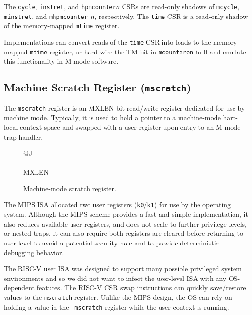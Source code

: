 The {\tt cycle}, {\tt instret}, and {\tt hpmcounter{\em n}} CSRs are
read-only shadows of {\tt mcycle}, {\tt minstret}, and {\tt mhpmcounter{\em
n}}, respectively.  The {\tt time} CSR is a read-only shadow of the
memory-mapped {\tt mtime} register.
\begin{commentary}
Implementations can convert reads of the {\tt time} CSR into loads to
the memory-mapped {\tt mtime} register, or hard-wire the TM bit in
{\tt mcounteren} to 0
and emulate this functionality in M-mode software.
\end{commentary}

\subsection{Machine Scratch Register ({\tt mscratch})}

The {\tt mscratch} register is an MXLEN-bit read/write register
dedicated for use by machine mode.  Typically, it is used to hold a
pointer to a machine-mode hart-local context space and swapped with a
user register upon entry to an M-mode trap handler.

\begin{figure}[h!]
{\footnotesize
\begin{center}
\begin{tabular}{@{}J}
 \\
\hline
{} \\
\hline
MXLEN \\
\end{tabular}
\end{center}
}
\vspace{-0.1in}
\caption{Machine-mode scratch register.}
\label{mscratchreg}
\end{figure}

\begin{commentary}
The MIPS ISA allocated two user registers ({\tt k0}/{\tt k1}) for use
by the operating system.  Although the MIPS scheme provides a fast and
simple implementation, it also reduces available user registers,  and
does not scale to further privilege levels, or nested traps.  It can
also require both registers are cleared before returning to user level
to avoid a potential security hole and to provide deterministic
debugging behavior.

The RISC-V user ISA was designed to support many possible privileged
system environments and so we did not want to infect the user-level
ISA with any OS-dependent features.  The RISC-V CSR swap instructions
can quickly save/restore values to the {\tt mscratch} register.
Unlike the MIPS design, the OS can rely on holding a value in the {\tt
  mscratch} register while the user context is running.
\end{commentary}

